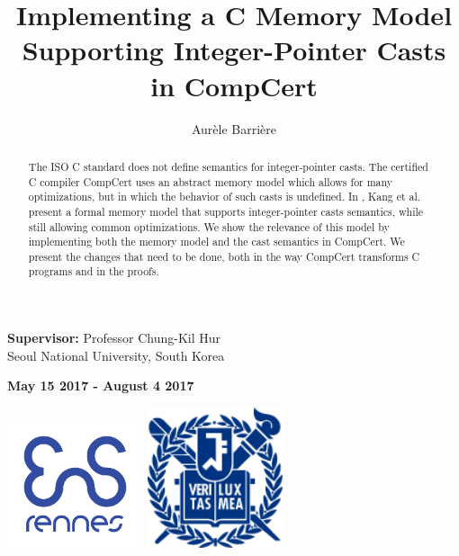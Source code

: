 \documentclass{llncs2e/llncs}
\begin{document}
%
\pagestyle{headings}  %
%
\title{Implementing a C Memory Model Supporting Integer-Pointer Casts in CompCert}
%
\author{Aur\`ele Barri\`ere}
%
%

\maketitle              %

\hrulefill

\begin{center}
  \textbf{Supervisor: } Professor Chung-Kil Hur\\
  Seoul National University, South Korea
\end{center}

\hrulefill

\begin{center}
  \textbf{May 15 2017 - August 4 2017}
\end{center}

\vfill
\begin{center}
\includegraphics[width=4cm]{img/enslogo.png}
\quad\quad\quad
\includegraphics[width=4cm]{img/snulogo.png}
\end{center}
\vfill
\begin{abstract}
  The ISO C standard does not define semantics for integer-pointer casts. The certified C compiler CompCert uses an abstract memory model which allows for many optimizations, but in which the behavior of such casts is undefined. In \cite{DBLP:conf/pldi/KangHMGZV15}, Kang et al. present a formal memory model that supports integer-pointer casts semantics, while still allowing common optimizations.
  We show the relevance of this model by implementing both the memory model and the cast semantics in CompCert. We present the changes that need to be done, both in the way CompCert transforms C programs and in the proofs.
\end{abstract}
%
\newpage
\end{document}
